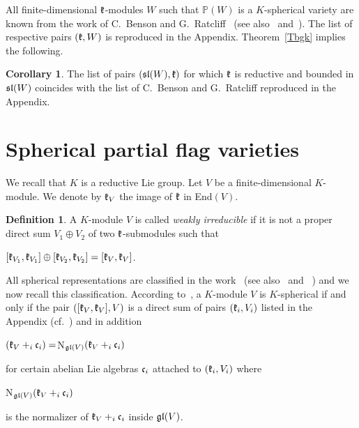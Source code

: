 \documentclass[12pt]{amsart}
\theoremstyle{definition}\newtheorem{theorem}{Theorem}[section]
\newtheorem{corollary}[proposition]{Corollary}
\theoremstyle{definition}\newtheorem{definition}[proposition]{Definition}
\theoremstyle{remark}\newtheorem{example}[proposition]{Example}
\begin{document}
All finite-dimensional $\frak k$-modules $W$ such that $\mathbb P(W)$ is a $K$-spherical variety are known from the work of C.~Benson and G.~Ratcliff~\cite{BR} (see also~\cite{Kc} and~\cite{Le}). The list of respective pairs $(\frak k, W)$ is reproduced in the Appendix. Theorem~\ref{Tbgk} implies the following.
\begin{corollary} The list of pairs $(\frak{sl}(W), \frak k)$ for which $\frak k$ is reductive and bounded in $\frak{sl}(W)$ coincides with the list of C.~Benson and G.~Ratcliff reproduced in the Appendix.\end{corollary}
\newpage\section{Spherical partial flag varieties}\label{Ssphgr}
We recall that $K$ is a reductive Lie group. Let $V$ be a finite-dimensional $K$-module. We denote by $\frak k_V$ the image of $\frak k$ in End$(V)$.
\begin{definition} A $K$-module $V$ is called {\it weakly irreducible} if it is not a proper direct sum $V_1\oplus V_2$ of two $\frak k$-submodules such that \begin{center}$[\frak k_{V_1}, \frak k_{V_1}]\oplus [\frak k_{V_2}, \frak k_{V_2}]=[\frak k_V, \frak k_V]$.\end{center}\end{definition}
All spherical representations are classified in the work~\cite{BR} (see also~\cite{Le} and ~\cite{Kc}) and we now recall this classification. According to~\cite{BR}, a $K$-module $V$ is $K$-spherical if and only if the pair $([\frak k_V, \frak k_V], V)$ is a direct sum of pairs $(\frak k_i, V_i)$ listed in the Appendix (cf.~\cite{BR}) and in addition \begin{center}$(\frak k_V+_i\frak c_i)=$N$_{\frak{gl}(V)}(\frak k_V+_i\frak c_i)$\end{center} for certain abelian Lie algebras $\frak c_i$ attached to $(\frak k_i, V_i)$ where \begin{center}N$_{\frak{gl}(V)}(\frak k_V+_i\frak c_i)$\end{center} is the normalizer of $\frak k_V+_i\frak c_i$ inside $\frak{gl}(V)$.
\end{document}
